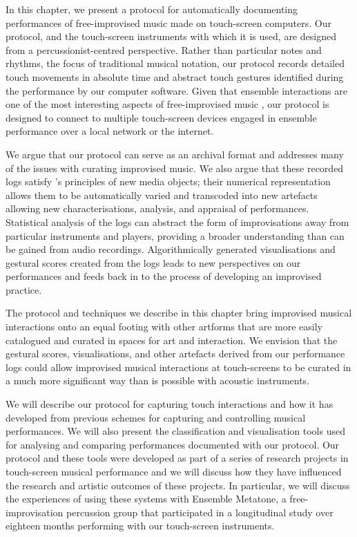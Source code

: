\documentclass[graybox]{svmult}
\begin{document}
In this chapter, we present a protocol for automatically documenting
performances of free-improvised music made on touch-screen computers.
Our protocol, and the touch-screen instruments with which it is used,
are designed from a percussionist-centred perspective. Rather than
particular notes and rhythms, the focus of traditional musical
notation, our protocol records detailed touch movements in absolute
time and abstract touch gestures identified during the performance by
our computer software. Given that ensemble interactions are one of the
most interesting aspects of free-improvised music \citep{Borgo:2006fv},
our protocol is designed to connect to multiple touch-screen devices
engaged in ensemble performance over a local network or the internet.

We argue that our protocol can serve as an archival format and
addresses many of the issues with curating improvised music. We also
argue that these recorded logs satisfy \citeauthor{Manovich:2002ly}'s
\citeyearpar{Manovich:2002ly} principles of new media objects; their
numerical representation allows them to be automatically varied and
transcoded into new artefacts allowing new characterisations,
analysis, and appraisal of performances. Statistical analysis of the
logs can abstract the form of improvisations away from particular
instruments and players, providing a broader understanding than can be
gained from audio recordings. Algorithmically generated visualisations
and gestural scores created from the logs leads to new perspectives on
our performances and feeds back in to the process of developing an
improvised practice.

The protocol and techniques we describe in this chapter bring
improvised musical interactions onto an equal footing with other
artforms that are more easily catalogued and curated in spaces for art
and interaction. We envision that the gestural scores, visualisations,
and other artefacts derived from our performance logs could allow improvised
musical interactions at touch-screens to be curated in a much more significant way than
is possible with acoustic instruments.

We will describe our protocol for capturing touch interactions and how
it has developed from previous schemes for capturing and controlling
musical performances. We will also present the classification and
visualisation tools used for analysing and comparing performances
documented with our protocol. Our protocol and these tools were
developed as part of a series of research projects in touch-screen
musical performance and we will discuss how they have influenced the
research and artistic outcomes of these projects. In particular, we
will discuss the experiences of using these systems with Ensemble
Metatone, a free-improvisation percussion group that participated in a
longitudinal study over eighteen months performing with our
touch-screen instruments.
\end{document}

